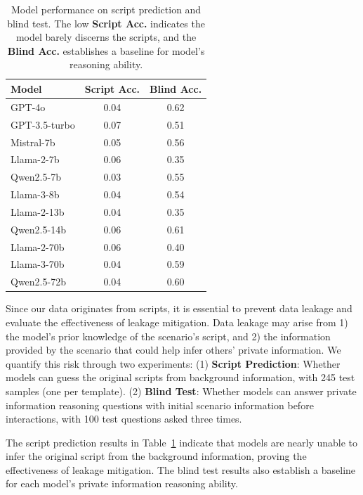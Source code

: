 \begin{table}
    \setlength{\abovecaptionskip}{0.1cm}
    \setlength{\belowcaptionskip}{-0.5cm}
    \centering
    \small
    \begin{tabular}{l|c|c} 
        \toprule[1.1pt]
        \textbf{Model} & \textbf{Script Acc.} & \textbf{Blind Acc.}\\
        \midrule[1.1pt]
        GPT-4o        & 0.04 & 0.62\\
        GPT-3.5-turbo & 0.07 & 0.51\\
        \hline
        Mistral-7b & 0.05 & 0.56\\
        Llama-2-7b & 0.06 & 0.35\\
        Qwen2.5-7b & 0.03 & 0.55\\
        Llama-3-8b & 0.04 & 0.54\\
        Llama-2-13b & 0.04 & 0.35\\
        Qwen2.5-14b & 0.06 & 0.61\\
        Llama-2-70b & 0.06 & 0.40\\
        Llama-3-70b & 0.04 & 0.59\\
        Qwen2.5-72b & 0.04 & 0.60\\
        \bottomrule[1.1pt]
    \end{tabular}
    \caption{Model performance on script prediction and blind test. The low \textbf{Script Acc.} indicates the model barely discerns the scripts, and the \textbf{Blind Acc.} establishes a baseline for model's reasoning ability.}
    \label{tab:data_leakage}
\end{table}

Since our data originates from scripts, it is essential to prevent data leakage and evaluate the effectiveness of leakage mitigation.
Data leakage may arise from 1) the model's prior knowledge of the scenario's script, and 2) the information provided by the scenario that could help infer others' private information.
We quantify this risk through two experiments:
(1) \textbf{Script Prediction}: Whether models can guess the original scripts from background information, with 245 test samples (one per template).
(2) \textbf{Blind Test}: Whether models can answer private information reasoning questions with initial scenario information before interactions, with 100 test questions asked three times.

The script prediction results in Table~\ref{tab:data_leakage} indicate that models are nearly unable to infer the original script from the background information, proving the effectiveness of leakage mitigation.
The blind test results also establish a baseline for each model's private information reasoning ability.
